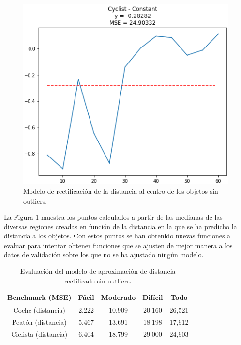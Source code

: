 \begin{figure}[H]
\begin{minipage}{0.32\textwidth}
	\end{minipage}\hfill
	\begin{minipage}{0.32\textwidth}
		\centering
		\includegraphics[width=1\linewidth]{Book/figures/6_approx_distancia/rectification2_lidar_cylist.png}
	\end{minipage}
	\caption{Modelo de rectificación de la distancia al centro de los objetos sin outliers.}
	\label{fig:Modelo de rectificación de la distancia al centro de los objetos sin outliers.}
\end{figure}

La Figura \ref{fig:Modelo de rectificación de la distancia al centro de los objetos sin outliers.} muestra los puntos calculados a partir de las medianas de las diversas regiones creadas en función de la distancia en la que se ha predicho la distancia a los objetos. Con estos puntos se han obtenido nuevas funciones a evaluar para intentar obtener funciones que se ajusten de mejor manera a los datos de validación sobre los que no se ha ajustado ningún modelo.

\begin{table}[H]
\centering
\begin{tabular}{|c|c|c|c|c|}
\hline
\textbf{Benchmark (MSE)} & \textbf{Fácil} & \textbf{Moderado} & \textbf{Difícil} & \textbf{Todo}\\ \hline \hline
Coche (distancia)        & 2,222          & 10,909             & 20,160       & 26,521     \\ \hline
Peatón (distancia)       & 5,467          & 13,691             & 18,198       & 17,912     \\ \hline
Ciclista (distancia)     & 6,404          & 18,799             & 29,000       & 24,903  \\ \hline
\end{tabular}
\caption{Evaluación del modelo de aproximación de distancia rectificado sin outliers.}
\label{fig:Evaluación del modelo de aproximación de distancia rectificado sin outliers.}
\end{table}

